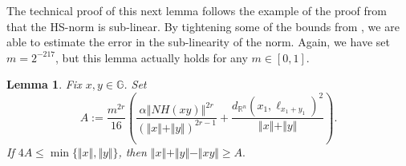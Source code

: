 \documentclass[11pt]{amsart}
\newtheorem{lemma}[theorem]{Lemma}
\theoremstyle{definition}
\numberwithin{theorem}{section} \numberwithin{equation}{section}
\begin{document}
The technical proof of this next lemma follows the example of the proof from \cite{HebSik}
that the HS-norm is sub-linear.
By tightening some of the bounds from \cite[Theorem 2]{HebSik},
we are able to estimate the error in the sub-linearity of the norm.
Again, we have set $m=2^{-217}$, but this lemma actually holds for any $m \in [0,1]$.

\begin{lemma}
\label{TI}
Fix $x,y \in \mathbb{G}$.
Set
$$
A := \frac{m^{2r}}{16} \left( \frac{\alpha \left\Vert NH\left( xy \right) \right\Vert^{2r}}{(\Vert x \Vert + \Vert y \Vert)^{2r-1}} + \frac{d_{\mathbb{R}^n}(x_1,\ell_{x_1+y_1})^2 }{\Vert x \Vert + \Vert y \Vert} \right).
$$
If $4A \leq \min \{ \Vert x \Vert, \Vert y \Vert \}$,
then 
$
\Vert x \Vert + \Vert y \Vert - \Vert xy \Vert
\geq A.
$
\end{lemma}
\end{document}
